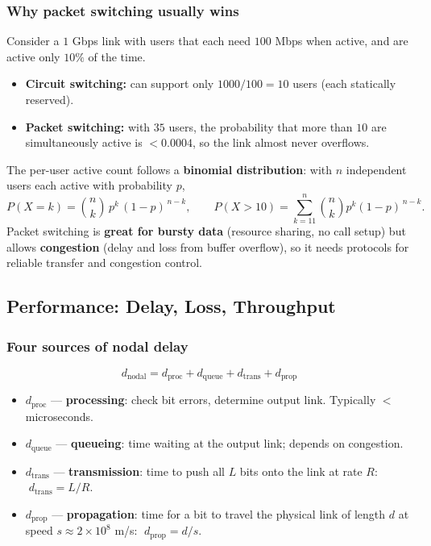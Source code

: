 \documentclass[hidelinks]{article}
\begin{document}
\subsubsection{Why packet switching usually wins}
Consider a $1$ Gbps link with users that each need $100$ Mbps when active,
and are active only $10\%$ of the time.
\begin{itemize}
    \item \textbf{Circuit switching:} can support only $1000/100 = 10$ users
    (each statically reserved).
    \item \textbf{Packet switching:} with $35$ users, the probability that
    more than $10$ are simultaneously active is $< 0.0004$, so the link
    almost never overflows.
\end{itemize}
The per-user active count follows a \textbf{binomial distribution}: with $n$
independent users each active with probability $p$,
\[
    P(X = k) = \binom{n}{k}\, p^{k}\,(1-p)^{\,n-k}, \qquad
    P(X > 10) = \sum_{k=11}^{n} \binom{n}{k} p^{k}(1-p)^{\,n-k}.
\]
Packet switching is \textbf{great for bursty data} (resource sharing,
no call setup) but allows \textbf{congestion} (delay and loss from buffer
overflow), so it needs protocols for reliable transfer and congestion
control.

\subsection{Performance: Delay, Loss, Throughput}

\subsubsection{Four sources of nodal delay}
\[
    d_{\text{nodal}} = d_{\text{proc}} + d_{\text{queue}}
                     + d_{\text{trans}} + d_{\text{prop}}
\]
\begin{itemize}
    \item $d_{\text{proc}}$ --- \textbf{processing}: check bit errors,
    determine output link. Typically $<$ microseconds.
    \item $d_{\text{queue}}$ --- \textbf{queueing}: time waiting at the
    output link; depends on congestion.
    \item $d_{\text{trans}}$ --- \textbf{transmission}: time to push all $L$
    bits onto the link at rate $R$:
    \(\; d_{\text{trans}} = L/R.\)
    \item $d_{\text{prop}}$ --- \textbf{propagation}: time for a bit to
    travel the physical link of length $d$ at speed
    $s \approx 2\times 10^{8}$ m/s:
    \(\; d_{\text{prop}} = d/s.\)
\end{itemize}
\end{document}
